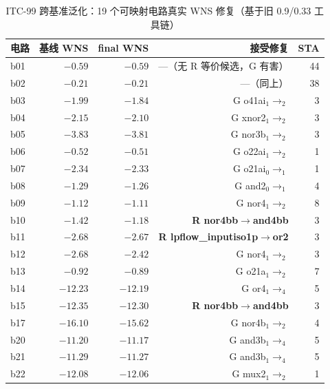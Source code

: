 \documentclass[journal]{IEEEtran}
\begin{document}
\begin{table}[!t]
\centering
\caption{ITC-99 跨基准泛化：19 个可映射电路真实 WNS 修复（基于旧 0.9/0.33 工具链）}
\label{tab:itc99}
\scriptsize
\setlength{\tabcolsep}{3pt}
\begin{tabular}{lrrrr}
\toprule
\textbf{电路} & \textbf{基线 WNS} & \textbf{final WNS} & \textbf{接受修复} & \textbf{STA} \\
\midrule
b01 & $-0.59$ & $-0.59$ & ---（无 R 等价候选，G 有害） & 44 \\
b02  & $-0.21$ & $-0.21$ & ---（同上） & 38 \\
b03  & $-1.99$ & $-1.84$ & G o41ai$_1$$\rightarrow_2$ & 3 \\
b04  & $-2.15$ & $-2.10$ & G xnor2$_1$$\rightarrow_2$ & 3 \\
b05  & $-3.83$ & $-3.81$ & G nor3b$_1$$\rightarrow_2$ & 3 \\
b06  & $-0.52$ & $-0.51$ & G o22ai$_1$$\rightarrow_2$ & 1 \\
b07  & $-2.34$ & $-2.33$ & G o21ai$_0$$\rightarrow_1$ & 1 \\
b08  & $-1.29$ & $-1.26$ & G and2$_0$$\rightarrow_1$ & 4 \\
b09  & $-1.12$ & $-1.11$ & G nor4$_1$$\rightarrow_2$ & 8 \\
b10  & $-1.42$ & $-1.18$ & \textbf{R nor4bb$\rightarrow$and4bb} & 3 \\
b11  & $-2.68$ & $-2.67$ & \textbf{R lpflow\_inputiso1p$\rightarrow$or2} & 3 \\
b12  & $-2.68$ & $-2.42$ & G nor4$_1$$\rightarrow_2$ & 3 \\
b13  & $-0.92$ & $-0.89$ & G o21a$_1$$\rightarrow_2$ & 7 \\
b14  & $-12.23$ & $-12.19$ & G or4$_1$$\rightarrow_4$ & 5 \\
b15  & $-12.35$ & $-12.30$ & \textbf{R nor4bb$\rightarrow$and4bb} & 3 \\
b17  & $-16.10$ & $-15.62$ & G nor4b$_1$$\rightarrow_2$ & 4 \\
b20  & $-11.20$ & $-11.17$ & G and3b$_1$$\rightarrow_4$ & 5 \\
b21  & $-11.29$ & $-11.27$ & G and3b$_1$$\rightarrow_4$ & 5 \\
b22  & $-12.08$ & $-12.06$ & G mux2$_1$$\rightarrow_2$ & 1 \\
\bottomrule
\end{tabular}
\end{table}
\end{document}
